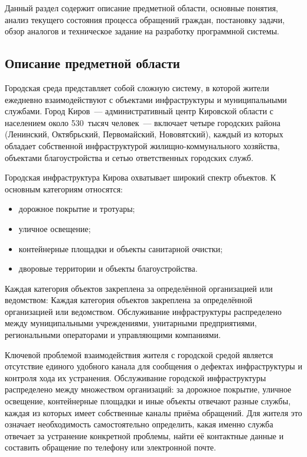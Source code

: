 Данный раздел содержит описание предметной области, основные понятия, анализ текущего состояния процесса обращений граждан, постановку задачи, обзор аналогов и техническое задание на разработку программной системы.

\subsection{Описание предметной области}

Городская среда представляет собой сложную систему, в которой жители ежедневно взаимодействуют с объектами инфраструктуры и муниципальными службами. Город Киров~--- административный центр Кировской области с населением около 530~тысяч человек~--- включает четыре городских района (Ленинский, Октябрьский, Первомайский, Нововятский), каждый из которых обладает собственной инфраструктурой жилищно-коммунального хозяйства, объектами благоустройства и сетью ответственных городских служб.

Городская инфраструктура Кирова охватывает широкий спектр объектов. К основным категориям относятся:
\begin{itemize}
    \item дорожное покрытие и тротуары;
    \item уличное освещение;
    \item контейнерные площадки и объекты санитарной очистки;
    \item дворовые территории и объекты благоустройства.
\end{itemize}

Каждая категория объектов закреплена за определённой организацией или ведомством:
Каждая категория объектов закреплена за определённой организацией или ведомством. Обслуживание инфраструктуры распределено между муниципальными учреждениями, унитарными предприятиями, региональными операторами и управляющими компаниями.

Ключевой проблемой взаимодействия жителя с городской средой является отсутствие единого удобного канала для сообщения о дефектах инфраструктуры и контроля хода их устранения. Обслуживание городской инфраструктуры распределено между множеством организаций: за дорожное покрытие, уличное освещение, контейнерные площадки и иные объекты отвечают разные службы, каждая из которых имеет собственные каналы приёма обращений. Для жителя это означает необходимость самостоятельно определить, какая именно служба отвечает за устранение конкретной проблемы, найти её контактные данные и составить обращение по телефону или электронной почте.

